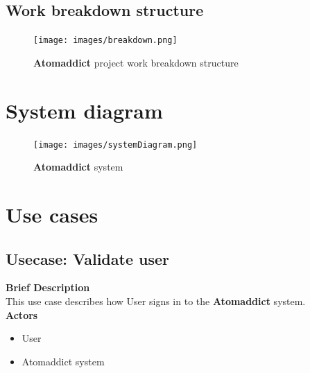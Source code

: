 \documentclass[12pt]{article}
\begin{document}
\subsection{Work breakdown structure}

\begin{figure}[H]
    \centering
    \texttt{[image: images/breakdown.png]}
    \caption{\textbf{Atomaddict} project work breakdown structure}
\end{figure}



\section{System diagram}

\begin{figure}[H]
    \centering
    \texttt{[image: images/systemDiagram.png]}
    \caption{\textbf{Atomaddict} system}
    \label{fig:system}
\end{figure}


\section{Use cases}
\subsection{Usecase: Validate user}
\textbf{Brief Description}\\
This use case describes how User signs in to the \textbf{Atomaddict} system.\\


\textbf{Actors}

\begin{itemize}

    \item User

    \item Atomaddict system

\end{itemize}
\end{document}
